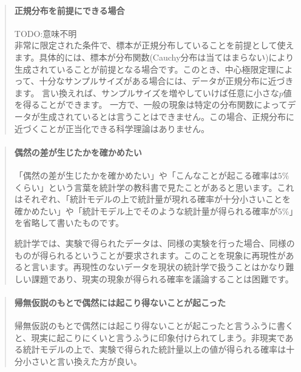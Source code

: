 \begin{mybox}
    \begin{quotation}
\paragraph{正規分布を前提にできる場合}
TODO:意味不明\\
非常に限定された条件で、標本が正規分布していることを前提として使えます。具体的には、標本が分布関数(Cauchy分布は当てはまらない)により生成されていることが前提となる場合です。このとき、中心極限定理によって、十分なサンプルサイズがある場合には、データが正規分布に近づきます。
言い換えれば、サンプルサイズを増やしていけば任意に小さな$p$値を得ることができます。
一方で、一般の現象は特定の分布関数によってデータが生成されているとは言うことはできません。この場合、正規分布に近づくことが正当化できる科学理論はありません。     
    \end{quotation}
\end{mybox}


\begin{mybox}
    \begin{quotation}
    \paragraph{偶然の差が生じたかを確かめたい}
    「偶然の差が生じたかを確かめたい」や「こんなことが起こる確率は$5\%$くらい」という言葉を統計学の教科書で見たことがあると思います。これはそれぞれ、「統計モデルの上で統計量が現れる確率が十分小さいことを確かめたい」や「統計モデル上でそのような統計量が得られる確率が$5\%$」を省略して書いたものです。
    
    統計学では、実験で得られたデータは、同様の実験を行った場合、同様のものが得られるということが要求されます。このことを現象に再現性があると言います。再現性のないデータを現状の統計学で扱うことはかなり難しい課題であり、現実の現象が得られる確率を議論することは困難です。
    \end{quotation}
    \end{mybox}
    
    
    \begin{mybox}
    \begin{quotation}
    \paragraph{帰無仮説のもとで偶然には起こり得ないことが起こった}
    帰無仮説のもとで偶然には起こり得ないことが起こったと言うふうに書くと、現実に起こりにくいと言うふうに印象付けられてしまう。非現実である統計モデルの上で、実験で得られた統計量以上の値が得られる確率は十分小さいと言い換えた方が良い。
    \end{quotation}
    \end{mybox}
    

